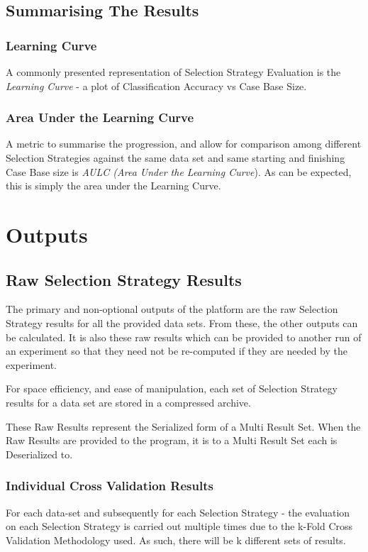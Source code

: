 \documentclass[a4paper,11pt]{report}
\begin{document}
\subsection{Summarising The Results}
\subsubsection{Learning Curve}\label{sec:multiresultset}
A commonly presented representation of Selection Strategy Evaluation is the \emph{Learning Curve} - a plot of Classification Accuracy vs Case Base Size.

\subsubsection{Area Under the Learning Curve}
A metric to summarise the progression, and allow for comparison among different Selection Strategies against the same data set and same starting and finishing Case Base size is \emph{AULC (Area Under the Learning Curve}). As can be expected, this is simply the area under the Learning Curve.

\section{Outputs}

\subsection{Raw Selection Strategy Results}
The primary and non-optional outputs of the platform are the raw Selection Strategy results for all the provided data sets. From these, the other outputs can be calculated. It is also these raw results which can be provided to another run of an experiment so that they need not be re-computed if they are needed by the experiment. 

For space efficiency, and ease of manipulation, each set of Selection Strategy results for a data set are stored in a compressed archive.

These Raw Results represent the Serialized form of a Multi Result Set. When the Raw Results are provided to the program, it is to a Multi Result Set each is Deserialized to.

\subsubsection{Individual Cross Validation Results}
For each data-set and subsequently for each Selection Strategy - the evaluation on each Selection Strategy is carried out multiple times due to the k-Fold Cross Validation Methodology used. As such, there will be k different sets of results. 
\end{document}
